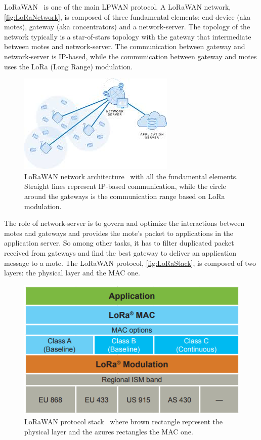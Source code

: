 LoRaWAN~\cite{loraalliancetechnicalcommittee2020} is one of the main LPWAN protocol.
A LoRaWAN network, \autoref{fig:LoRaNetwork}, is composed of three fundamental elements: end-device (aka motes), gateway (aka concentrators) and a network-server. 
% 
The topology of the network typically is a star-of-stars topology with the gateway that intermediate between motes and network-server.
% 
The communication between gateway and network-server is IP-based, while the communication between gateway and motes uses the LoRa (Long Range) modulation.

\begin{figure}[h]
    \centering
    \includegraphics{figures/lora_architecture2.png}
    \caption[LoRaWAN network architecture]{LoRaWAN network architecture~\cite{muntasirjoarder2020} with all the fundamental elements. Straight lines represent IP-based communication, while the circle around the gateways is the communication range based on LoRa modulation.}
    \label{fig:LoRaNetwork}
\end{figure}

The role of network-server is to govern and optimize the interactions between motes and gateways and provides the mote's packet to applications in the application server.
% 
So among other tasks, it has to filter duplicated packet received from gateways and find the best gateway to deliver an application message to a mote.
% 
The LoRaWAN protocol, \autoref{fig:LoRaStack}, is composed of two layers: the  physical layer and the MAC one.

\begin{figure}[h]
    \centering
    \includegraphics{figures/loraStack.png}
    \caption[LoRaWAN protocol stack]{LoRaWAN protocol stack~\cite{loraalliance2020} where brown rectangle represent the physical layer and the azures rectangles the MAC one.}
    \label{fig:LoRaStack}
\end{figure}

